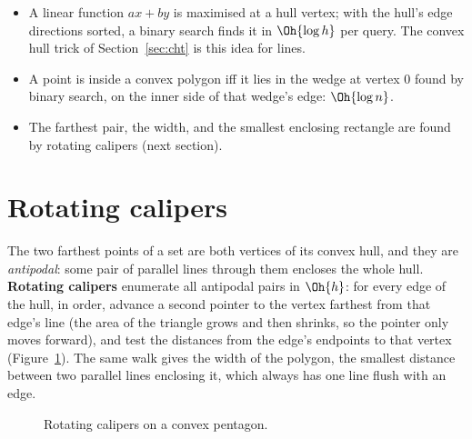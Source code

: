 \begin{trick}
\begin{itemize}
  \item A linear function $ax + by$ is maximised at a hull vertex; with the hull's edge directions sorted, a binary search finds it in
        $\Oh{\log h}$ per query. The convex hull trick of Section~\ref{sec:cht} is this idea for lines.
  \item A point is inside a convex polygon iff it lies in the wedge at vertex 0 found by binary search, on the inner side of that wedge's
        edge: $\Oh{\log n}$.
  \item The farthest pair, the width, and the smallest enclosing rectangle are found by rotating calipers (next section).
\end{itemize}
\end{trick}

\section[Rotating calipers]{Rotating calipers \hfill \ioi}\label{sec:calipers}

The two farthest points of a set are both vertices of its convex hull, and they are \emph{antipodal}: some pair of parallel lines through
them encloses the whole hull. \textbf{Rotating calipers} enumerate all antipodal pairs in $\Oh{h}$: for every edge of the hull, in order,
advance a second pointer to the vertex farthest from that edge's line (the area of the triangle grows and then shrinks, so the pointer
only moves forward), and test the distances from the edge's endpoints to that vertex (Figure~\ref{fig:calipers}). The same walk gives the
width of the polygon, the smallest distance between two parallel lines enclosing it, which always has one line flush with an edge.

\begin{figure}[htbp]
\centering
{}
\caption{Rotating calipers on a convex pentagon.}
\label{fig:calipers}
\end{figure}

